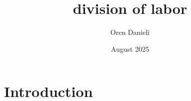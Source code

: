 \documentclass{article}
\title{division of labor}
\author{Oren Danieli}
\date{August 2025}
\begin{document}
\maketitle

\section{Introduction}
\end{document}
